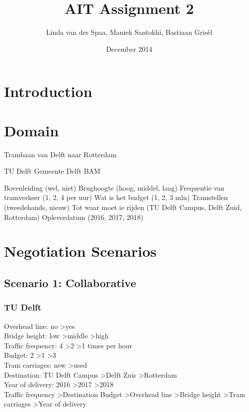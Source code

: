 \documentclass{article}
\title{AIT Assignment 2}
\author{Linda van der Spaa, Maniek Santokhi, Bastiaan Gris\`el}
\date{December 2014}
\begin{document}
\maketitle

\section{Introduction}

\section{Domain}
Trambaan van Delft naar Rotterdam

TU Delft
Gemeente Delft
BAM

Bovenleiding (wel, niet)
Brughoogte (hoog, middel, laag)
Frequentie van tramverkeer (1, 2, 4 per uur)
Wat is het budget (1, 2, 3 mln)
Tramstellen (tweedehands, nieuw)
Tot waar moet ie rijden (TU Delft Campus, Delft Zuid, Rotterdam)
Opleverdatum (2016, 2017, 2018)


\section{Negotiation Scenarios}

\subsection{Scenario 1: Collaborative}

\subsubsection{TU Delft}
Overhead line: no \textgreater yes \\
Bridge height: low \textgreater middle \textgreater high \\
Traffic frequency: 4 \textgreater 2 \textgreater 1 times per hour \\
Budget: 2 \textgreater 1 \textgreater 3 \\
Tram carriages: new \textgreater used \\
Destination: TU Delft Campus \textgreater Delft Zuis \textgreater Rotterdam \\
Year of delivery: 2016 \textgreater 2017 \textgreater 2018 \\

Traffic frequency \textgreater Destination Budget \textgreater Overhead line \textgreater Bridge height \textgreater Tram carriages \textgreater Year of delivery
\end{document}
